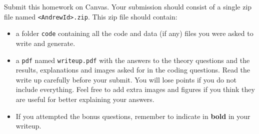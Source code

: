 \documentclass{article}
\begin{document}
Submit this homework on Canvas.
Your submission should consist of a single zip file named {\tt<AndrewId>.zip}. This zip file should contain:

\begin{itemize}
    \item a folder {\tt code} containing all the code and data (if any) files you were asked to write and generate. 

    \item a \texttt{pdf} named {\tt writeup.pdf} with the answers to the theory questions and the results, explanations and images asked for in the coding questions. Read the write up carefully before your submit. You will lose points if you do not include everything. Feel free to add extra images and figures if you think they are useful for better explaining your answers.

    \item If you attempted the bonus questions, remember to indicate in \textbf{bold} in your writeup.

\end{itemize}
\end{document}
